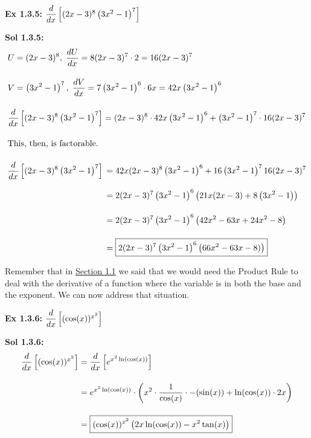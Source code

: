 \begin{tcolorbox}[example]
    \textbf{Ex 1.3.5: } $\dfrac{d}{dx} \left[(2x - 3)^8\left(3x^2 - 1\right)^7\right]$ 
\end{tcolorbox}
\begin{tcolorbox}[solution]
    \textbf{Sol 1.3.5: } \begin{align*}
        & U = (2x - 3)^8, \; \dfrac{dU}{dx} = 8(2x - 3)^7 \cdot 2 = 16(2x - 3)^7 \\[11pt]
        & V = \left(3x^2 - 1\right)^7, \; \dfrac{dV}{dx} = 7\left(3x^2 - 1\right)^6 \cdot 6x  = 42x\left(3x^2 - 1\right)^6\\[11pt]
        & \dfrac{d}{dx} \left[(2x - 3)^8\left(3x^2 - 1\right)^7\right] = (2x - 3)^8 \cdot 42x\left(3x^2 - 1\right)^6 + \left(3x^2 - 1\right)^7 \cdot 16(2x - 3)^7 \\[11pt]
        & \text{This, then, is factorable.} \\[11pt]
        & \dfrac{d}{dx} \left[(2x - 3)^8\left(3x^2 - 1\right)^7\right] \begin{aligned}[t]
            & = 42x(2x - 3)^8\left(3x^2 - 1\right)^6 + 16\left(3x^2 - 1\right)^7 16(2x - 3)^7 \\[11pt]
            & = 2(2x - 3)^7\left(3x^2 - 1\right)^6\left(21x(2x - 3) + 8\left(3x^2 - 1\right)\right) \\[11pt]
            & = 2(2x - 3)^7\left(3x^2 - 1\right)^6\left(42x^2 - 63x + 24x^2 - 8\right) \\[11pt]
            & = \boxed{2(2x - 3)^7\left(3x^2 - 1\right)^6\left(66x^2 - 63x - 8)\right)}
        \end{aligned}
    \end{align*}
\end{tcolorbox}

Remember that in \hyperlink{Section 1.1}{Section 1.1} we said that we would need the Product Rule to deal with the derivative of a function where the variable is in both the base and the exponent. We can now address that situation. \par

\begin{tcolorbox}[example]
    \textbf{Ex 1.3.6: } $\dfrac{d}{dx} \left[(\cos (x))^{x^2}\right]$
\end{tcolorbox}
\begin{tcolorbox}[solution]
    \textbf{Sol 1.3.6: } \begin{align*}
        \dfrac{d}{dx} \left[(\cos (x))^{x^2}\right] & = \dfrac{d}{dx} \left[e^{x^2\ln (\cos (x))}\right] \\[11pt]
        & = e^{x^2\ln (\cos (x))} \cdot \left(x^2 \cdot \dfrac{1}{\cos (x)} \cdot -(\sin (x)) + \ln (\cos (x)) \cdot 2x\right) \\[11pt]
        & = \boxed{(\cos (x))^{x^2}\left(2x\ln (\cos (x)) - x^2\tan (x)\right)}
    \end{align*} 
\end{tcolorbox}

